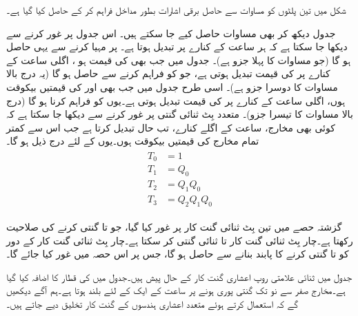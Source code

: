 شکل  میں تین پلٹوں کو مساوات  سے حاصل برقی اشارات بطور مداخل فراہم کر کے حاصل کیا گیا ہے۔

 جدول  دیکھ کر بھی مساوات  حاصل کیے جا سکتے ہیں۔ اس جدول پر غور کرنے سے دیکھا جا سکتا ہے کہ  ہر ساعت کے کنارے پر تبدیل ہوتا ہے۔  پر  مہیا کرنے سے یہی حاصل ہو گا (جو مساوات  کا پہلا جزو ہے)۔ جدول میں جب بھی  کی قیمت  ہو ، اگلی ساعت کے کنارے پر  کی قیمت تبدیل ہوتی ہے، جو  کو  فراہم کرنے سے حاصل ہو گا (یہ درج بالا مساوات کا دوسرا جزو ہے)۔ اسی طرح جدول میں جب بھی  اور  کی قیمتیں بیکوقت  ہوں، اگلی ساعت کے کنارے پر  کی قیمت تبدیل ہوتی ہے۔یوں  کو  فراہم کرنا ہو گا (درج بالا مساوات کا تیسرا جزو)۔ متعدد بِٹ ثنائی گنتی پر غور کرنے سے دیکھا جا سکتا ہے کہ کوئی بھی مخارج، ساعت کے اگلے کنارے، تب حال تبدیل کرتا ہے جب اس سے کمتر تمام مخارج کی قیمتیں بیکوقت  ہوں۔یوں  کے لئے درج ذیل ہو گا۔
\begin{gather}
\begin{aligned}\label{مساوات_گنت_کار_چار_بِٹ}
T_0&=1\\
T_1&=Q_0\\
T_2&=Q_1Q_0\\
T_3&=Q_2Q_1Q_0
\end{aligned}
\end{gather}

گزشتہ حصے میں تین بِٹ ثنائی گنت کار پر غور کیا گیا، جو  تا  گنتی کرنے کی صلاحیت رکھتا ہے۔چار بِٹ ثنائی گنت کار  تا  ثنائی گنتی کر سکتا ہے۔چار بِٹ ثنائی گنت کار کے دور کو  تا  گنتی کرنے کا پابند بنانے سے  حاصل ہو گا، جس پر اس حصہ میں غور کیا جائے گا۔

جدول  میں ثنائی علامتی روپ اعشاری گنت کار کے حال پیش ہیں۔جدول میں   کی قطار کا اضافہ کیا گیا ہے۔مخارج  صفر سے نو تک گنتی پوری ہونے پر ساعت کے ایک کے لئے بلند ہوتا ہے۔ہم آگے دیکھیں گے کہ  استعمال کرتے ہوئے متعدد اعشاری ہندسوں کے گنت کار تخلیق دیے جاتے ہیں۔

